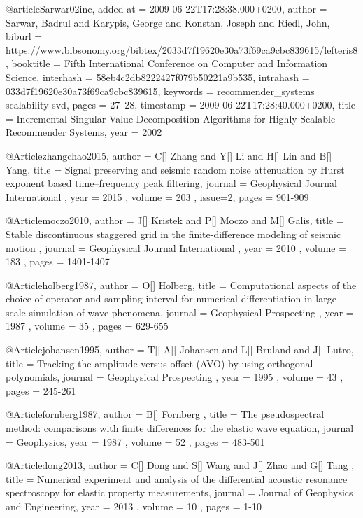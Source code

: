 @article{Sarwar02inc,
  added-at = {2009-06-22T17:28:38.000+0200},
  author = {Sarwar, Badrul and Karypis, George and Konstan, Joseph and Riedl, John},
  biburl = {https://www.bibsonomy.org/bibtex/2033d7f19620e30a73f69ca9cbc839615/lefteris8},
  booktitle = {Fifth International Conference on Computer and Information Science},
  interhash = {58eb4c2db8222427f079b50221a9b535},
  intrahash = {033d7f19620e30a73f69ca9cbc839615},
  keywords = {recommender_systems scalability svd},
  pages = {27--28},
  timestamp = {2009-06-22T17:28:40.000+0200},
  title = {Incremental Singular Value Decomposition Algorithms for Highly Scalable
	Recommender Systems},
  year = 2002
}

@Article{zhangchao2015,
 author =  {  C[] Zhang and Y[] Li and H[] Lin and B[] Yang},
 title =   {Signal preserving and seismic random noise attenuation by Hurst exponent based time–frequency peak filtering},
 journal = { Geophysical Journal International },
 year =    { 2015 },
 volume =  { 203 },
 issue=2,
 pages =   { 901-909 }
}



@Article{moczo2010,
 author =  {  J[] Kristek and P[] Moczo and M[] Galis},
 title =   {Stable discontinuous staggered grid in the finite-difference modeling of seismic motion },
 journal = { Geophysical Journal International },
 year =    { 2010 },
 volume =  { 183 },
 pages =   { 1401-1407 }
}

@Article{holberg1987,
 author =  { O[] Holberg},
 title =   {Computational aspects of the choice of operator and sampling interval for numerical differentiation in large-scale simulation of wave phenomena},
 journal = { Geophysical Prospecting },
 year =    { 1987 },
 volume =  { 35 },
 pages =   { 629-655 }
}

@Article{johansen1995,
 author =  { T[] A[] Johansen and L[] Bruland and J[] Lutro},
 title =   {Tracking the amplitude versus offset (AVO) by using orthogonal polynomials},
 journal = { Geophysical Prospecting },
 year =    { 1995 },
 volume =  { 43 },
 pages =   { 245-261 }
}

@Article{fornberg1987,
 author =  { B[] Fornberg },
 title =   {The pseudospectral method: comparisons with finite differences for the elastic
wave equation},
 journal = { Geophysics},
 year =    { 1987 },
 volume =  { 52 },
 pages =   { 483-501 }
}

@Article{dong2013,
 author =  { C[] Dong and S[] Wang and J[] Zhao and G[] Tang },
 title =   {Numerical experiment and analysis of the differential acoustic resonance spectroscopy for elastic property measurements},
 journal = { Journal of Geophysics and Engineering},
 year =    { 2013 },
 volume =  { 10 },
 pages =   { 1-10 }
}

